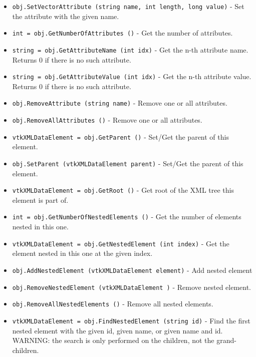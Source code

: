 \begin{itemize}
\item  \verb|obj.SetVectorAttribute (string name, int length, long value)| -  Set the attribute with the given name.

\item  \verb|int = obj.GetNumberOfAttributes ()| -  Get the number of attributes.

\item  \verb|string = obj.GetAttributeName (int idx)| -  Get the n-th attribute name.
 Returns 0 if there is no such attribute.

\item  \verb|string = obj.GetAttributeValue (int idx)| -  Get the n-th attribute value.
 Returns 0 if there is no such attribute.

\item  \verb|obj.RemoveAttribute (string name)| -  Remove one or all attributes.

\item  \verb|obj.RemoveAllAttributes ()| -  Remove one or all attributes.

\item  \verb|vtkXMLDataElement = obj.GetParent ()| -  Set/Get the parent of this element.

\item  \verb|obj.SetParent (vtkXMLDataElement parent)| -  Set/Get the parent of this element.

\item  \verb|vtkXMLDataElement = obj.GetRoot ()| -  Get root of the XML tree this element is part of.

\item  \verb|int = obj.GetNumberOfNestedElements ()| -  Get the number of elements nested in this one.

\item  \verb|vtkXMLDataElement = obj.GetNestedElement (int index)| -  Get the element nested in this one at the given index.

\item  \verb|obj.AddNestedElement (vtkXMLDataElement element)| -  Add nested element

\item  \verb|obj.RemoveNestedElement (vtkXMLDataElement )| -  Remove nested element.

\item  \verb|obj.RemoveAllNestedElements ()| -  Remove all nested elements.

\item  \verb|vtkXMLDataElement = obj.FindNestedElement (string id)| -  Find the first nested element with the given id, given name, or given
 name and id.
 WARNING: the search is only performed on the children, not 
 the grand-children.


\end{itemize}
